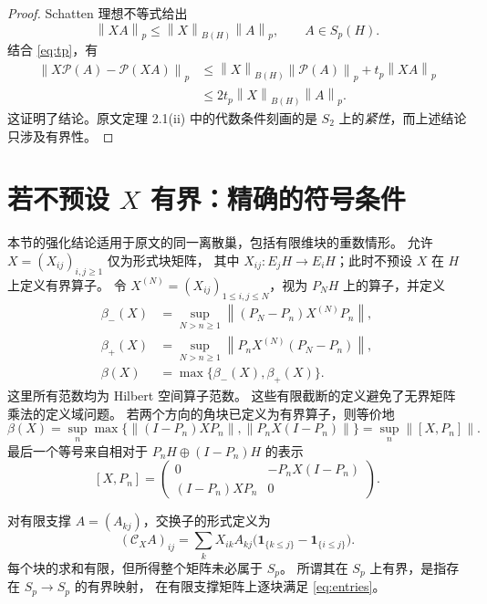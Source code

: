 \documentclass[UTF8,11pt,a4paper,fontset=fandol]{ctexart}
\theoremstyle{remark}
\newcommand{\BH}{B(H)}
\newcommand{\PP}{\mathcal P}
\newcommand{\CC}{\mathcal C}
\newcommand{\norm}[1]{\left\lVert #1\right\rVert}
\begin{document}
\begin{proof}
Schatten 理想不等式给出
\[
 \norm{XA}_p\leq\norm{X}_{\BH}\norm{A}_p,
 \qquad A\in S_p(H).
\]
结合 \eqref{eq:tp}，有
\begin{align*}
 \norm{X\PP(A)-\PP(XA)}_p
 &\leq\norm{X}_{\BH}\norm{\PP(A)}_p
       +t_p\norm{XA}_p\\
 &\leq 2t_p\norm{X}_{\BH}\norm{A}_p.
\end{align*}
这证明了结论。原文定理 2.1(ii) 中的代数条件刻画的是
$S_2$ 上的\emph{紧性}，而上述结论只涉及有界性。
\end{proof}

\section{若不预设 \texorpdfstring{$X$}{X} 有界：精确的符号条件}

本节的强化结论适用于原文的同一离散巢，包括有限维块的重数情形。
允许 $X=(X_{ij})_{i,j\geq1}$ 仅为形式块矩阵，
其中 $X_{ij}:E_jH\to E_iH$；此时不预设 $X$ 在 $H$ 上定义有界算子。
令 $X^{(N)}=(X_{ij})_{1\leq i,j\leq N}$，视为 $P_NH$ 上的算子，并定义
\begin{align}
 \beta_-(X)&=\sup_{N>n\geq1}
     \norm{(P_N-P_n)X^{(N)}P_n},\label{eq:beta-}\\
 \beta_+(X)&=\sup_{N>n\geq1}
     \norm{P_nX^{(N)}(P_N-P_n)},\label{eq:beta+}\\
 \beta(X)&=\max\{\beta_-(X),\beta_+(X)\}.\label{eq:beta}
\end{align}
这里所有范数均为 Hilbert 空间算子范数。
这些有限截断的定义避免了无界矩阵乘法的定义域问题。
若两个方向的角块已定义为有界算子，则等价地
\begin{equation}\label{eq:cut}
 \beta(X)=\sup_n\max\{
 \norm{(I-P_n)XP_n},\norm{P_nX(I-P_n)}\}
 =\sup_n\norm{[X,P_n]}.
\end{equation}
最后一个等号来自相对于 $P_nH\oplus(I-P_n)H$ 的表示
\[
 [X,P_n]=\begin{pmatrix}
 0&-P_nX(I-P_n)\\
 (I-P_n)XP_n&0
 \end{pmatrix}.
\]

对有限支撑 $A=(A_{kj})$，交换子的形式定义为
\begin{equation}\label{eq:entries}
 (\CC_X A)_{ij}
 =\sum_k X_{ik}A_{kj}
 \bigl(\mathbf1_{\{k\leq j\}}-\mathbf1_{\{i\leq j\}}\bigr).
\end{equation}
每个块的求和有限，但所得整个矩阵未必属于 $S_p$。
所谓其在 $S_p$ 上有界，是指存在 $S_p\to S_p$ 的有界映射，
在有限支撑矩阵上逐块满足 \eqref{eq:entries}。
\end{document}
